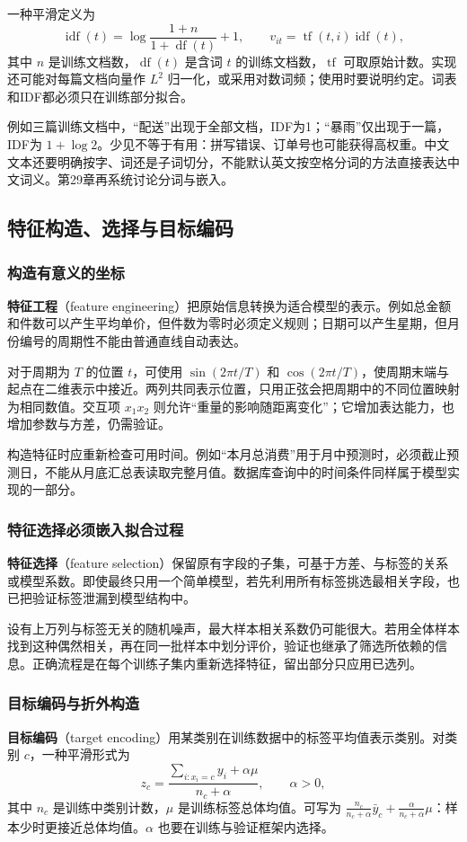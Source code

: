 \documentclass[UTF8,fontset=none,zihao=-4,a4paper]{ctexart}
\newcommand{\term}[1]{\textbf{#1}}
\numberwithin{equation}{section}
\numberwithin{figure}{section}
\begin{document}
一种平滑定义为
\[
 \operatorname{idf}(t)=\log\frac{1+n}{1+\operatorname{df}(t)}+1,
 \qquad v_{it}=\operatorname{tf}(t,i)\operatorname{idf}(t),
\]
其中 $n$ 是训练文档数，$\operatorname{df}(t)$ 是含词 $t$ 的训练文档数，$\operatorname{tf}$ 可取原始计数。实现还可能对每篇文档向量作 $L^2$ 归一化，或采用对数词频；使用时要说明约定。词表和IDF都必须只在训练部分拟合。

例如三篇训练文档中，“配送”出现于全部文档，IDF为1；“暴雨”仅出现于一篇，IDF为 $1+\log2$。少见不等于有用：拼写错误、订单号也可能获得高权重。中文文本还要明确按字、词还是子词切分，不能默认英文按空格分词的方法直接表达中文词义。第29章再系统讨论分词与嵌入。

\subsection{特征构造、选择与目标编码}
\subsubsection{构造有意义的坐标}
\term{特征工程}（feature engineering）把原始信息转换为适合模型的表示。例如总金额和件数可以产生平均单价，但件数为零时必须定义规则；日期可以产生星期，但月份编号的周期性不能由普通直线自动表达。

对于周期为 $T$ 的位置 $t$，可使用 $\sin(2\pi t/T)$ 和 $\cos(2\pi t/T)$，使周期末端与起点在二维表示中接近。两列共同表示位置，只用正弦会把周期中的不同位置映射为相同数值。交互项 $x_1x_2$ 则允许“重量的影响随距离变化”；它增加表达能力，也增加参数与方差，仍需验证。

构造特征时应重新检查可用时间。例如“本月总消费”用于月中预测时，必须截止预测日，不能从月底汇总表读取完整月值。数据库查询中的时间条件同样属于模型实现的一部分。

\subsubsection{特征选择必须嵌入拟合过程}
\term{特征选择}（feature selection）保留原有字段的子集，可基于方差、与标签的关系或模型系数。即使最终只用一个简单模型，若先利用所有标签挑选最相关字段，也已把验证标签泄漏到模型结构中。

设有上万列与标签无关的随机噪声，最大样本相关系数仍可能很大。若用全体样本找到这种偶然相关，再在同一批样本中划分评价，验证也继承了筛选所依赖的信息。正确流程是在每个训练子集内重新选择特征，留出部分只应用已选列。

\subsubsection{目标编码与折外构造}
\term{目标编码}（target encoding）用某类别在训练数据中的标签平均值表示类别。对类别 $c$，一种平滑形式为
\[
 z_c=\frac{\sum_{i:x_i=c}y_i+\alpha\mu}{n_c+\alpha},\qquad \alpha>0,
\]
其中 $n_c$ 是训练中类别计数，$\mu$ 是训练标签总体均值。可写为 $\frac{n_c}{n_c+\alpha}\bar y_c+\frac\alpha{n_c+\alpha}\mu$：样本少时更接近总体均值。$\alpha$ 也要在训练与验证框架内选择。
\end{document}

